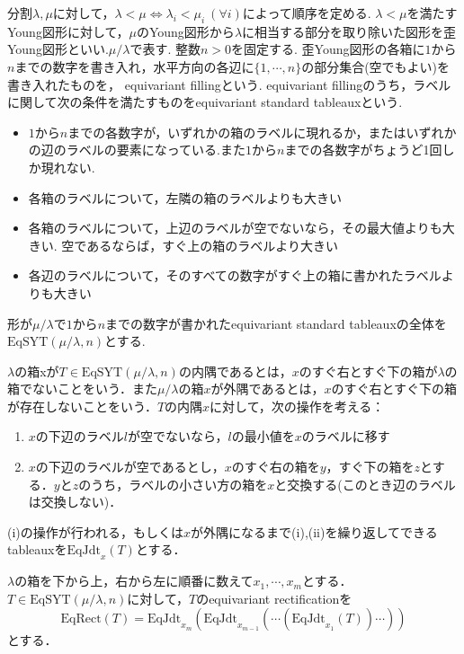 \begin{defin}
  分割$\lambda, \mu$に対して，$\lambda<\mu\Leftrightarrow \lambda_i<\mu_i\:(\forall i)$によって順序を定める. $\lambda<\mu$を満たすYoung図形に対して，$\mu$のYoung図形から$\lambda$に相当する部分を取り除いた図形を歪Young図形といい.$\mu/\lambda$で表す. 整数$n>0$を固定する. 歪Young図形の各箱に$1$から$n$までの数字を書き入れ，水平方向の各辺に$\{1,\cdots,n\}$の部分集合(空でもよい)を書き入れたものを， equivariant fillingという. equivariant fillingのうち，ラベルに関して次の条件を満たすものをequivariant standard tableauxという.
  \begin{itemize}
    \item $1$から$n$までの各数字が，いずれかの箱のラベルに現れるか，またはいずれかの辺のラベルの要素になっている.また$1$から$n$までの各数字がちょうど1回しか現れない.
    \item 各箱のラベルについて，左隣の箱のラベルよりも大きい
    \item 各箱のラベルについて，上辺のラベルが空でないなら，その最大値よりも大きい. 空であるならば，すぐ上の箱のラベルより大きい
    \item 各辺のラベルについて，そのすべての数字がすぐ上の箱に書かれたラベルよりも大きい
  \end{itemize}
  形が$\mu/\lambda$で$1$から$n$までの数字が書かれたequivariant standard tableauxの全体を$\text{EqSYT}(\mu/\lambda, n)$とする.
\end{defin}

\begin{defin}
  $\lambda$の箱xが$T\in\text{EqSYT}(\mu/\lambda, n)$の内隅であるとは，$x$のすぐ右とすぐ下の箱が$\lambda$の箱でないことをいう．また$\mu/\lambda$の箱$x$が外隅であるとは，$x$のすぐ右とすぐ下の箱が存在しないことをいう．$T$の内隅$x$に対して，次の操作を考える：
  \begin{enumerate}
    \item $x$の下辺のラベル$l$が空でないなら，$l$の最小値を$x$のラベルに移す
    \item $x$の下辺のラベルが空であるとし，$x$のすぐ右の箱を$y$，すぐ下の箱を$z$とする．$y$と$z$のうち，ラベルの小さい方の箱を$x$と交換する(このとき辺のラベルは交換しない)．
  \end{enumerate}
  (i)の操作が行われる，もしくは$x$が外隅になるまで(i),(ii)を繰り返してできるtableauxを$\text{EqJdt}_x(T)$とする．
\end{defin}

\begin{defin}
  $\lambda$の箱を下から上，右から左に順番に数えて$x_1,\cdots,x_m$とする．$T\in\text{EqSYT}(\mu/\lambda, n)$に対して，$T$のequivariant rectificationを
  \[
  \text{EqRect}(T)=\text{EqJdt}_{x_m}(\text{EqJdt}_{x_{m-1}}(\cdots(\text{EqJdt}_{x_1}(T))\cdots))
  \]
  とする．
\end{defin}


